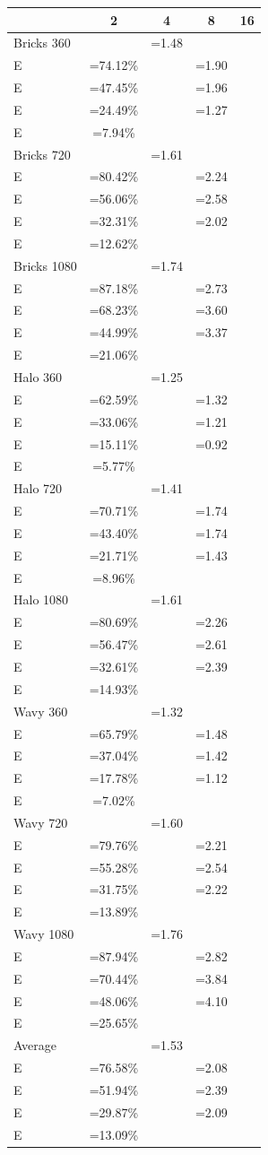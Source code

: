 \newcommand{\SE}[2]{\footnotesize \(\begin{aligned}S&=#1\times \\[-5pt] E&=#2\% \end{aligned}\)}
\begin{tabular}{l|c c c c}
&2&4&8&16\\
\hline
Bricks 360&\SE{1.48}{74.12}&\SE{1.90}{47.45}&\SE{1.96}{24.49}&\SE{1.27}{7.94}\\
Bricks 720&\SE{1.61}{80.42}&\SE{2.24}{56.06}&\SE{2.58}{32.31}&\SE{2.02}{12.62}\\
Bricks 1080&\SE{1.74}{87.18}&\SE{2.73}{68.23}&\SE{3.60}{44.99}&\SE{3.37}{21.06}\\
Halo 360&\SE{1.25}{62.59}&\SE{1.32}{33.06}&\SE{1.21}{15.11}&\SE{0.92}{5.77}\\
Halo 720&\SE{1.41}{70.71}&\SE{1.74}{43.40}&\SE{1.74}{21.71}&\SE{1.43}{8.96}\\
Halo 1080&\SE{1.61}{80.69}&\SE{2.26}{56.47}&\SE{2.61}{32.61}&\SE{2.39}{14.93}\\
Wavy 360&\SE{1.32}{65.79}&\SE{1.48}{37.04}&\SE{1.42}{17.78}&\SE{1.12}{7.02}\\
Wavy 720&\SE{1.60}{79.76}&\SE{2.21}{55.28}&\SE{2.54}{31.75}&\SE{2.22}{13.89}\\
Wavy 1080&\SE{1.76}{87.94}&\SE{2.82}{70.44}&\SE{3.84}{48.06}&\SE{4.10}{25.65}\\
Average&\SE{1.53}{76.58}&\SE{2.08}{51.94}&\SE{2.39}{29.87}&\SE{2.09}{13.09}\\
\end{tabular}